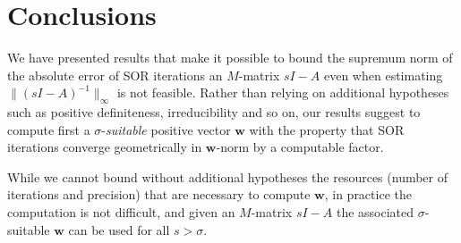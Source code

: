 \documentclass{article}
\newcommand{\w}{{\bm w}}
\newcommand{\1}{\mathbf 1}
\begin{document}
\section{Conclusions}

We have presented results that make it possible to bound the supremum norm of
the absolute error of SOR iterations an $M$-matrix $sI-A$ even when estimating
$\bigl\|(sI-A)^{-1}\bigr\|_\infty$ is not feasible. Rather than
 relying on additional hypotheses such as positive definiteness, irreducibility
 and so on, our results suggest to
compute first a $\sigma$-\emph{suitable} positive vector $\w$ with the property
that SOR iterations converge geometrically in $\w$-norm by a computable factor.

While we cannot bound without additional
hypotheses the resources (number of iterations and precision) that are necessary
to compute $\w$, in practice the computation is not difficult, and given an
$M$-matrix $sI-A$ the associated $\sigma$-suitable $\w$ can be used for all
$s>\sigma$.  
\end{document}
